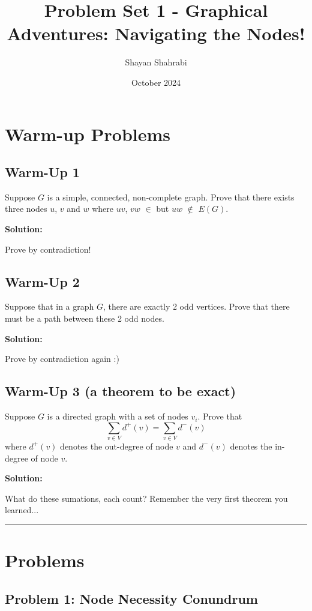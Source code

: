 \documentclass{article}
\title{Problem Set 1 - Graphical Adventures: Navigating the Nodes!}
\author{Shayan Shahrabi}
\date{October 2024}
\begin{document}
\maketitle

\section*{Warm-up Problems}

\subsection*{Warm-Up 1}
Suppose $G$ is a simple, connected, non-complete graph. Prove that there exists
three nodes $u$, $v$ and $w$ where $uv$, $vw$ $\in$ but $uw$ $\notin$ $E(G)$.


\textbf{Solution:}

Prove by contradiction!

\subsection*{Warm-Up 2}
Suppose that in a graph $G$, there are exactly 2 odd vertices. Prove that there must be a path between these 2 odd nodes.


\textbf{Solution:}
 
Prove by contradiction again :)



\subsection*{Warm-Up 3 (a theorem to be exact)}
Suppose $G$ is a directed graph with a set of nodes $v_i$. Prove that 
\[
\sum_{v \in V} d^+(v) = \sum_{v \in V} d^-(v)
\]
where $d^+(v)$ denotes the out-degree of node $v$ and $d^-(v)$ denotes the in-degree of node $v$.


\textbf{Solution: }

What do these sumations, each count? Remember the very first theorem you learned...

\vspace{20pt}
\hrule
\vspace{20pt}

\section*{Problems}

\subsection*{Problem 1: Node Necessity Conundrum}
\end{document}

